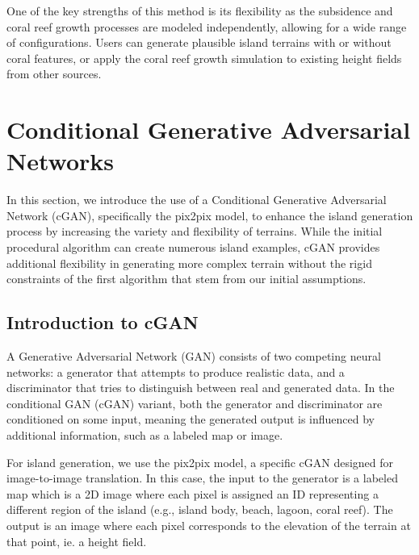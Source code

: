 One of the key strengths of this method is its flexibility as the subsidence and coral reef growth processes are modeled independently, allowing for a wide range of configurations. Users can generate plausible island terrains with or without coral features, or apply the coral reef growth simulation to existing height fields from other sources.





\section{Conditional Generative Adversarial Networks}
\label{sec:coral-island-cGAN-training}

In this section, we introduce the use of a Conditional Generative Adversarial Network (cGAN), specifically the pix2pix model, to enhance the island generation process by increasing the variety and flexibility of terrains. While the initial procedural algorithm can create numerous island examples, cGAN provides additional flexibility in generating more complex terrain without the rigid constraints of the first algorithm that stem from our initial assumptions.

\subsection{Introduction to cGAN}

A Generative Adversarial Network (GAN) consists of two competing neural networks: a generator that attempts to produce realistic data, and a discriminator that tries to distinguish between real and generated data. In the conditional GAN (cGAN) variant, both the generator and discriminator are conditioned on some input, meaning the generated output is influenced by additional information, such as a labeled map or image.

For island generation, we use the pix2pix model, a specific cGAN designed for image-to-image translation. In this case, the input to the generator is a labeled map which is a 2D image where each pixel is assigned an ID representing a different region of the island (e.g., island body, beach, lagoon, coral reef). The output is an image where each pixel corresponds to the elevation of the terrain at that point, ie. a height field.

